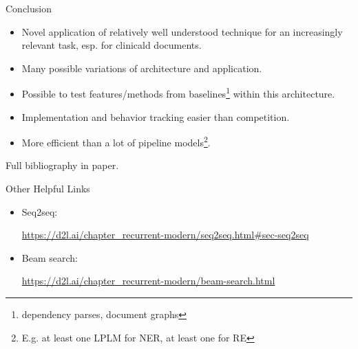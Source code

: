 \documentclass[usenames,dvipsnames,pdf]{beamer}
\begin{document}
        
        \begin{frame}{Conclusion}
          \begin{itemize}
          \item
            Novel application of relatively well understood technique for an increasingly relevant task, esp. for clinicald documents.
          \item
            Many possible variations of architecture and application.
          \item
            Possible to test features/methods from baselines\footnote{dependency parses, document graphs}
            within this architecture.
          \item
            Implementation and behavior tracking easier than competition.
          \item
            More efficient than a lot of pipeline models\footnote{E.g. at least one LPLM for NER, at least one for RE}.
          \end{itemize}

          Full bibliography in paper.
        \end{frame}

        \begin{frame}{Other Helpful Links}
          \begin{itemize}
          \item
            Seq2seq:

            
            {\footnotesize \url{https://d2l.ai/chapter_recurrent-modern/seq2seq.html\#sec-seq2seq}}
          \item
            Beam search:

            
            {\small \url{https://d2l.ai/chapter_recurrent-modern/beam-search.html}}
            
          \end{itemize}
        \end{frame}
      
\end{document}
